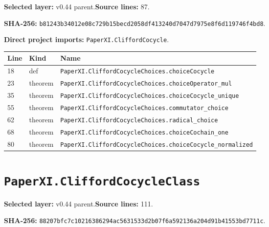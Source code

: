 \documentclass[10pt,oneside]{book}
\begin{document}
\textbf{Selected layer:} v0.44 parent.\quad\textbf{Source lines:} 87.\par\textbf{SHA-256:} {\scriptsize\nolinkurl{b81243b34012e08c729b15becd2058df413240d7047d7975e8f6d119746f4bd8}}.


\textbf{Direct project imports:} \nolinkurl{PaperXI.CliffordCocycle}.

\begin{longtable}{@{}p{}p{}p{}@{}}\toprule Line&Kind&Name\\\midrule\endhead

18&def&\nolinkurl{PaperXI.CliffordCocycleChoices.choiceCocycle}\\

23&theorem&\nolinkurl{PaperXI.CliffordCocycleChoices.choiceOperator_mul}\\

35&theorem&\nolinkurl{PaperXI.CliffordCocycleChoices.choiceCocycle_unique}\\

55&theorem&\nolinkurl{PaperXI.CliffordCocycleChoices.commutator_choice}\\

62&theorem&\nolinkurl{PaperXI.CliffordCocycleChoices.radical_choice}\\

68&theorem&\nolinkurl{PaperXI.CliffordCocycleChoices.choiceCochain_one}\\

80&theorem&\nolinkurl{PaperXI.CliffordCocycleChoices.choiceCocycle_normalized}\\

\bottomrule\end{longtable}

\section{\texorpdfstring{\nolinkurl{PaperXI.CliffordCocycleClass}}{PaperXI.CliffordCocycleClass}}\label{module:PaperXI.CliffordCocycleClass}

\textbf{Selected layer:} v0.44 parent.\quad\textbf{Source lines:} 111.\par\textbf{SHA-256:} {\scriptsize\nolinkurl{88207bfc7c10216386294ac5631533d2b07f6a592136a204d91b41553bd7711c}}.

\end{document}
